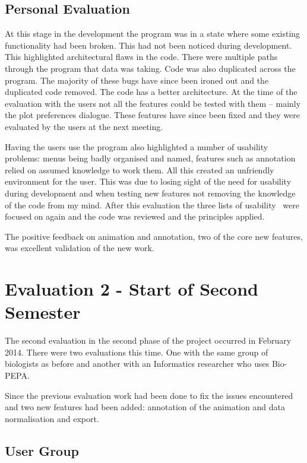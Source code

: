 \subsection{Personal Evaluation}

At this stage in the development the program was in a state where some existing functionality had been broken.  This had not been noticed during development.  This highlighted architectural flaws in the code.  There were multiple paths through the program that data was taking.  Code was also duplicated across the program.  The majority of these bugs have since been ironed out and the duplicated code removed. The code has a better architecture.  At the time of the evaluation with the users not all the features could be tested with them -- mainly the plot preferences dialogue.  These features have since been fixed and they were evaluated by the users at the next meeting.

Having the users use the program also highlighted a number of usability problems: menus being badly organised and named, features such as annotation relied on assumed knowledge to work them.  All this created an unfriendly environment for the user.  This was due to losing sight of the need for usability during development and when testing new features not removing the knowledge of the code from my mind.  After this evaluation the three lists of usability~\cite{shgold}\cite{normsev}\cite{neilten} were focused on again and the code was reviewed and the principles applied.

The positive feedback on animation and annotation, two of the core new features, was excellent validation of the new work.

\section{Evaluation 2 - Start of Second Semester}
\label{sec:eval2}

The second evaluation in the second phase of the project occurred in February 2014.  There were two evaluations this time.  One with the same group of biologists as before and another with an Informatics researcher who uses Bio-PEPA.

Since the previous evaluation work had been done to fix the issues encountered and two new features had been added: annotation of the animation and data normalisation and export.

\subsection{User Group}

